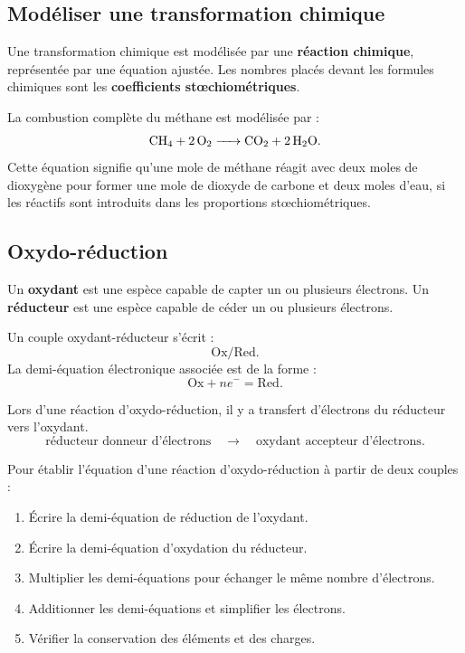 \documentclass[11pt,a4paper]{article}
\begin{document}
\subsection{Modéliser une transformation chimique}

\begin{definitionbox}
Une transformation chimique est modélisée par une \textbf{réaction chimique}, représentée par une équation ajustée. Les nombres placés devant les formules chimiques sont les \textbf{coefficients stœchiométriques}.
\end{definitionbox}

\begin{exemplebox}
La combustion complète du méthane est modélisée par :
\[
\ce{CH4 + 2 O2 -> CO2 + 2 H2O}.
\]
Cette équation signifie qu'une mole de méthane réagit avec deux moles de dioxygène pour former une mole de dioxyde de carbone et deux moles d'eau, si les réactifs sont introduits dans les proportions stœchiométriques.
\end{exemplebox}

\subsection{Oxydo-réduction}

\begin{definitionbox}
Un \textbf{oxydant} est une espèce capable de capter un ou plusieurs électrons. Un \textbf{réducteur} est une espèce capable de céder un ou plusieurs électrons.

Un couple oxydant-réducteur s'écrit :
\[
\text{Ox}/\text{Red}.
\]
La demi-équation électronique associée est de la forme :
\[
\text{Ox}+ne^- = \text{Red}.
\]
\end{definitionbox}

\begin{retenirbox}
Lors d'une réaction d'oxydo-réduction, il y a transfert d'électrons du réducteur vers l'oxydant.
\[
\text{réducteur donneur d'électrons} \quad \longrightarrow \quad \text{oxydant accepteur d'électrons}.
\]
\end{retenirbox}

\begin{methodbox}
Pour établir l'équation d'une réaction d'oxydo-réduction à partir de deux couples :
\begin{enumerate}
\item Écrire la demi-équation de réduction de l'oxydant.
\item Écrire la demi-équation d'oxydation du réducteur.
\item Multiplier les demi-équations pour échanger le même nombre d'électrons.
\item Additionner les demi-équations et simplifier les électrons.
\item Vérifier la conservation des éléments et des charges.
\end{enumerate}
\end{methodbox}
\end{document}

